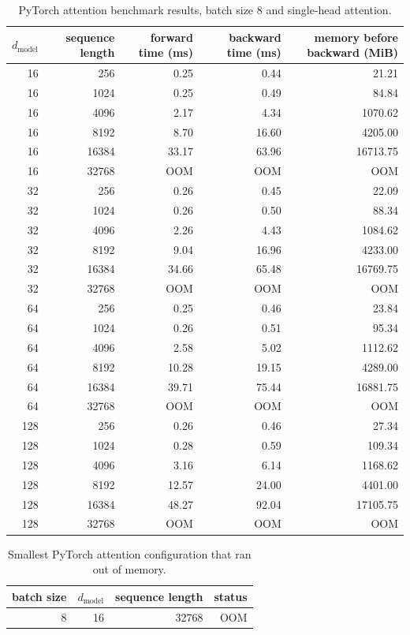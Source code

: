 \documentclass[11pt]{article}
\begin{document}
\begin{table}[H]
\centering
\scriptsize
\caption{PyTorch attention benchmark results, batch size 8 and single-head attention.}
\setlength{\tabcolsep}{3pt}
\begin{tabular}{rrrrr}
\toprule
$d_{\text{model}}$ & sequence length & forward time (ms) & backward time (ms) & memory before backward (MiB) \\
\midrule
16 & 256 & 0.25 & 0.44 & 21.21 \\
16 & 1024 & 0.25 & 0.49 & 84.84 \\
16 & 4096 & 2.17 & 4.34 & 1070.62 \\
16 & 8192 & 8.70 & 16.60 & 4205.00 \\
16 & 16384 & 33.17 & 63.96 & 16713.75 \\
16 & 32768 & OOM & OOM & OOM \\
32 & 256 & 0.26 & 0.45 & 22.09 \\
32 & 1024 & 0.26 & 0.50 & 88.34 \\
32 & 4096 & 2.26 & 4.43 & 1084.62 \\
32 & 8192 & 9.04 & 16.96 & 4233.00 \\
32 & 16384 & 34.66 & 65.48 & 16769.75 \\
32 & 32768 & OOM & OOM & OOM \\
64 & 256 & 0.25 & 0.46 & 23.84 \\
64 & 1024 & 0.26 & 0.51 & 95.34 \\
64 & 4096 & 2.58 & 5.02 & 1112.62 \\
64 & 8192 & 10.28 & 19.15 & 4289.00 \\
64 & 16384 & 39.71 & 75.44 & 16881.75 \\
64 & 32768 & OOM & OOM & OOM \\
128 & 256 & 0.26 & 0.46 & 27.34 \\
128 & 1024 & 0.28 & 0.59 & 109.34 \\
128 & 4096 & 3.16 & 6.14 & 1168.62 \\
128 & 8192 & 12.57 & 24.00 & 4401.00 \\
128 & 16384 & 48.27 & 92.04 & 17105.75 \\
128 & 32768 & OOM & OOM & OOM \\
\bottomrule
\end{tabular}
\end{table}

\begin{table}[H]
\centering
\caption{Smallest PyTorch attention configuration that ran out of memory.}
\begin{tabular}{rrrr}
\toprule
batch size & $d_{\text{model}}$ & sequence length & status \\
\midrule
8 & 16 & 32768 & OOM \\
\bottomrule
\end{tabular}
\end{table}
\end{document}
